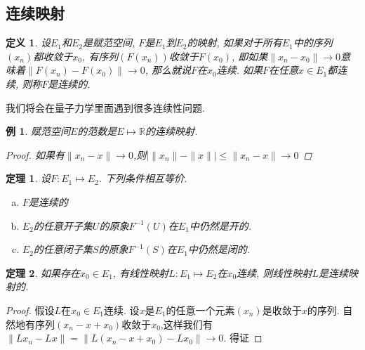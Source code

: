 \documentclass{book}
\newtheorem{definition}{\hspace{2em}定义}[section]
\newtheorem{theorem}{\hspace{2em}定理}[section]
\newtheorem{proof}{证明}[section]
\newtheorem{example}{例}[section]
\begin{document}
\subsection*{连续映射}
\begin{definition}
  设$E_1$和$E_2$是赋范空间, $F$是$E_1$到$E_2$的映射, 如果对于所有$E_1$中的序列$(x_n)$都收敛于$x_0$, 有序列$(F(x_n))$收敛于$F(x_0)$, 即如果$\|x_n-x_0\|\to0$意味着$\|F(x_n)-F(x_0)\|\to0$, 那么就说$F$在$x_0$连续. 如果$F$在任意$x\in E_1$都连续, 则称$F$是连续的.
\end{definition}
我们将会在量子力学里面遇到很多连续性问题.
\begin{example}
  赋范空间$E$的范数是$E\mapsto\mathbb{R}$的连续映射.
  \begin{proof}
    如果有$\|x_n-x\|\to0$,则$|\|x_n\|-\|x\||\leq\|x_n-x\|\to 0$
  \end{proof}
\end{example}
\begin{theorem}
  设$F:E_1\mapsto E_2$. 下列条件相互等价.
  \begin{enumerate}[(a)]
    \item $F$是连续的
    \item $E_2$的任意开子集$U$的原象$F^{-1}(U)$在$E_1$中仍然是开的.
    \item $E_2$的任意闭子集$S$的原象$F^{-1}(S)$在$E_1$中仍然是闭的.
  \end{enumerate}
\end{theorem}
\begin{theorem}\label{continuous linear map}
  如果存在$x_0\in E_1$, 有线性映射$L:E_1\mapsto E_2$在$x_0$连续, 则线性映射$L$是连续映射的.
\end{theorem}
\begin{proof}
  假设$L$在$x_0\in E_1$连续. 设$x$是$E_1$的任意一个元素$(x_n)$是收敛于$x$的序列. 自然地有序列$(x_n-x+x_0)$收敛于$x_0$,这样我们有$\|Lx_n-Lx\|=\|L(x_n-x+x_0)-Lx_0\|\to 0$. 得证
\end{proof}
\end{document}
